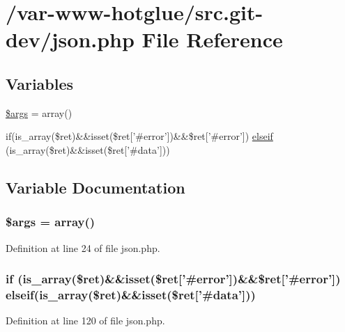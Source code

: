 \hypertarget{json_8php}{
\section{/var-\/www-\/hotglue/src.git-\/dev/json.php File Reference}
\label{json_8php}
}
\subsection*{Variables}
\begin{DoxyCompactItemize}
\item 
\hyperlink{json_8php_a67e94494731d99ed23b123e95175bc10}{\$args} = array()
\item 
if(is\_\-array(\$ret)\&\&isset(\$ret\mbox{[}'\#error'\mbox{]})\&\&\$ret\mbox{[}'\#error'\mbox{]}) \hyperlink{json_8php_affd32ec1771cd364116738727d3a1ed8}{elseif} (is\_\-array(\$ret)\&\&isset(\$ret\mbox{[}'\#data'\mbox{]}))
\end{DoxyCompactItemize}


\subsection{Variable Documentation}
\hypertarget{json_8php_a67e94494731d99ed23b123e95175bc10}{
\subsubsection[{\$args}]{\setlength{\rightskip}{0pt plus 5cm}\$args = array()}}
\label{json_8php_a67e94494731d99ed23b123e95175bc10}


Definition at line 24 of file json.php.

\hypertarget{json_8php_affd32ec1771cd364116738727d3a1ed8}{
\subsubsection[{elseif}]{\setlength{\rightskip}{0pt plus 5cm}if (is\_\-array(\$ret)\&\&isset(\$ret\mbox{[}'\#error'\mbox{]})\&\&\$ret\mbox{[}'\#error'\mbox{]}) {\bf elseif}(is\_\-array(\$ret)\&\&isset(\$ret\mbox{[}'\#data'\mbox{]}))}}
\label{json_8php_affd32ec1771cd364116738727d3a1ed8}


Definition at line 120 of file json.php.

